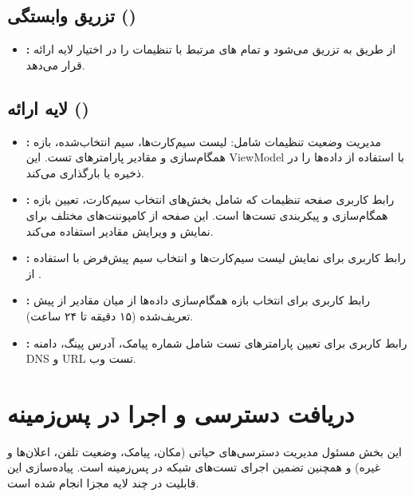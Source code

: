 \subsection{تزریق وابستگی ()}
\begin{itemize}
    \item \textbf{:}  
    از طریق  به  تزریق می‌شود و تمام ‌های مرتبط با تنظیمات را در اختیار لایه ارائه قرار می‌دهد.
\end{itemize}

\subsection{لایه ارائه ()}
\begin{itemize}
    \item \textbf{:}  
    مدیریت وضعیت تنظیمات شامل: لیست سیم‌کارت‌ها، سیم انتخاب‌شده، بازه همگام‌سازی و مقادیر پارامترهای تست. این ViewModel با استفاده از  داده‌ها را در  ذخیره یا بارگذاری می‌کند.

    \item \textbf{:}  
    رابط کاربری صفحه تنظیمات که شامل بخش‌های انتخاب سیم‌کارت، تعیین بازه همگام‌سازی و پیکربندی تست‌ها است. این صفحه از کامپوننت‌های مختلف برای نمایش و ویرایش مقادیر استفاده می‌کند.

    \item \textbf{:}  
    رابط کاربری برای نمایش لیست سیم‌کارت‌ها و انتخاب سیم پیش‌فرض با استفاده از .

    \item \textbf{:}  
    رابط کاربری برای انتخاب بازه همگام‌سازی داده‌ها از میان مقادیر از پیش تعریف‌شده (۱۵ دقیقه تا ۲۴ ساعت).

    \item \textbf{:}  
    رابط کاربری برای تعیین پارامترهای تست شامل شماره پیامک، آدرس پینگ، دامنه DNS و URL تست وب.
\end{itemize}



\section{دریافت دسترسی و اجرا در پس‌زمینه}
این بخش مسئول مدیریت دسترسی‌های حیاتی (مکان، پیامک، وضعیت تلفن، اعلان‌ها و غیره) و همچنین تضمین اجرای تست‌های شبکه در پس‌زمینه است. پیاده‌سازی این قابلیت در چند لایه مجزا انجام شده است.

